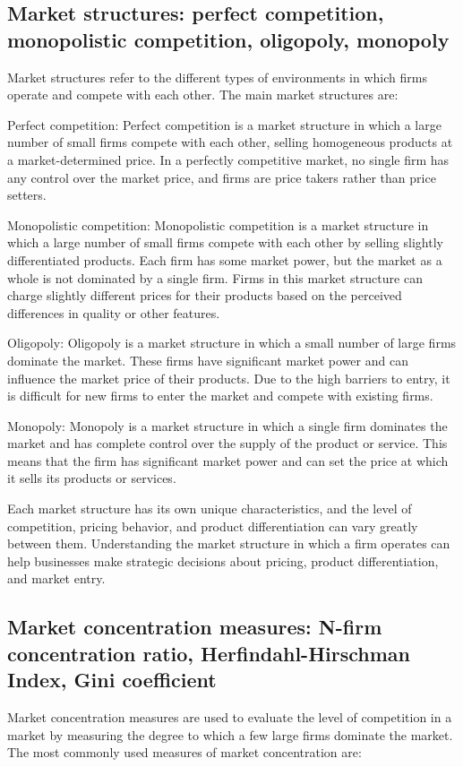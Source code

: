 \documentclass[12pt, a4paper, oneside]{article}
\begin{document}
\subsection{ Market structures: perfect competition, monopolistic competition, oligopoly, monopoly }
Market structures refer to the different types of environments in which firms operate and compete with each other. The main market structures are:

Perfect competition: Perfect competition is a market structure in which a large number of small firms compete with each other, selling homogeneous products at a market-determined price. In a perfectly competitive market, no single firm has any control over the market price, and firms are price takers rather than price setters.

Monopolistic competition: Monopolistic competition is a market structure in which a large number of small firms compete with each other by selling slightly differentiated products. Each firm has some market power, but the market as a whole is not dominated by a single firm. Firms in this market structure can charge slightly different prices for their products based on the perceived differences in quality or other features.

Oligopoly: Oligopoly is a market structure in which a small number of large firms dominate the market. These firms have significant market power and can influence the market price of their products. Due to the high barriers to entry, it is difficult for new firms to enter the market and compete with existing firms.

Monopoly: Monopoly is a market structure in which a single firm dominates the market and has complete control over the supply of the product or service. This means that the firm has significant market power and can set the price at which it sells its products or services.

Each market structure has its own unique characteristics, and the level of competition, pricing behavior, and product differentiation can vary greatly between them. Understanding the market structure in which a firm operates can help businesses make strategic decisions about pricing, product differentiation, and market entry.




\subsection{ Market concentration measures: N-firm concentration ratio, Herfindahl-Hirschman Index, Gini coefficient }
Market concentration measures are used to evaluate the level of competition in a market by measuring the degree to which a few large firms dominate the market. The most commonly used measures of market concentration are:
\end{document}
